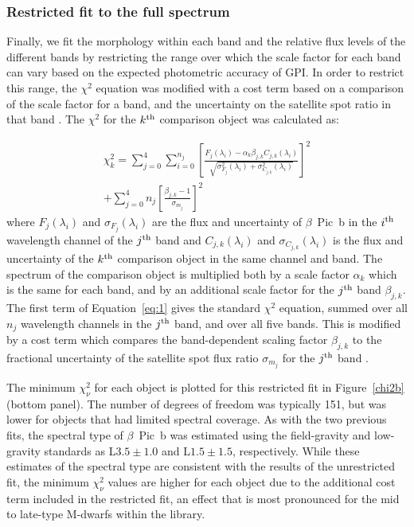 \documentclass[twocolumn]{aastex6}
\begin{document}
\subsubsection{Restricted fit to the full spectrum}
\label{sec:restricted}
Finally, we fit the morphology within each band and the relative flux levels of the different bands by restricting the range over which the scale factor for each band can vary based on the expected photometric accuracy of GPI. In order to restrict this range, the $\chi^2$ equation was modified with a cost term based on a comparison of the scale factor for a band, and the uncertainty on the satellite spot ratio in that band \citep{2014SPIE.9147E..85M}. The $\chi^2$ for the $k^{\rm th}$ comparison object was calculated as:

\begin{multline}\label{eq:1}
    \chi^2_k = \sum_{j=0}^4 \sum_{i=0}^{n_j} \left[\frac{F_j(\lambda_i) - \alpha_k\beta_{j,k} C_{j,k}(\lambda_i)}{\sqrt{\sigma^2_{F_j}(\lambda_i) + \sigma^2_{C_{j,k}}(\lambda_i)}}\right]^2 \\
    + \sum_{j=0}^4 n_j\left[\frac{\beta_{j,k}-1}{\sigma_{m_j}}\right]^2
\end{multline}
where $F_j(\lambda_i)$ and $\sigma_{F_j}(\lambda_i)$ are the flux and uncertainty of $\beta$~Pic~b in the $i^{\rm th}$ wavelength channel of the $j^{\rm th}$ band and $C_{j, k}(\lambda_i)$ and $\sigma_{C_{j,k}}(\lambda_i)$ is the flux and uncertainty of the $k^{\rm th}$ comparison object in the same channel and band. The spectrum of the comparison object is multiplied both by a scale factor $\alpha_k$ which is the same for each band, and by an additional scale factor for the $j^{\rm th}$ band $\beta_{j,k}$. The first term of Equation~\eqref{eq:1} gives the standard $\chi^2$ equation, summed over all $n_j$ wavelength channels in the $j^{\rm th}$ band, and over all five bands. This is modified by a cost term which compares the band-dependent scaling factor $\beta_{j,k}$ to the fractional uncertainty of the satellite spot flux ratio $\sigma_{m_j}$ for the $j^{\rm th}$ band \citep{2014SPIE.9147E..85M}.

The minimum $\chi^2_{\nu}$ for each object is plotted for this restricted fit in Figure~\ref{chi2b} (bottom panel). The number of degrees of freedom was typically 151, but was lower for objects that had limited spectral coverage. As with the two previous fits, the spectral type of $\beta$~Pic~b was estimated using the field-gravity and low-gravity standards as L$3.5\pm1.0$ and L$1.5\pm1.5$, respectively. While these estimates of the spectral type are consistent with the results of the unrestricted fit, the minimum $\chi^2_{\nu}$ values are higher for each object due to the additional cost term included in the restricted fit, an effect that is most pronounced for the mid to late-type M-dwarfs within the library.
\end{document}
